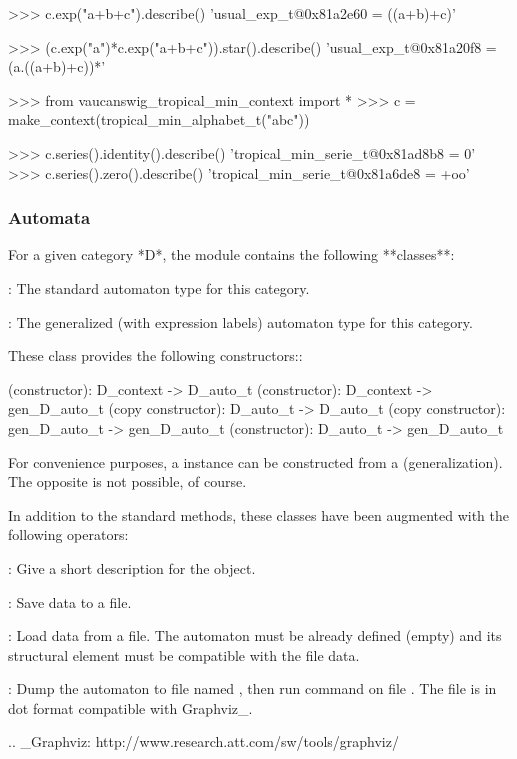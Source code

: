   >>> c.exp("a+b+c").describe()
  'usual_exp_t@0x81a2e60 = ((a+b)+c)'

  >>> (c.exp("a")*c.exp("a+b+c")).star().describe()
  'usual_exp_t@0x81a20f8 = (a.((a+b)+c))*'

  >>> from vaucanswig_tropical_min_context import *
  >>> c = make_context(tropical_min_alphabet_t("abc"))

  >>> c.series().identity().describe()
  'tropical_min_serie_t@0x81ad8b8 = 0'
  >>> c.series().zero().describe()
  'tropical_min_serie_t@0x81a6de8 = +oo'

\subsubsection{Automata}

For  a  given  category  *D*,  the  module  
contains the following **classes**:

: 
  The standard automaton type for this category.

:
  The  generalized (with  expression labels)  automaton type  for this
  category.

These class provides the following constructors::

  (constructor): D_context -> D_auto_t
  (constructor): D_context -> gen_D_auto_t
  (copy constructor): D_auto_t -> D_auto_t
  (copy constructor): gen_D_auto_t -> gen_D_auto_t
  (constructor): D_auto_t -> gen_D_auto_t

For   convenience  purposes,  a     instance   can  be
constructed from a   (generalization). The opposite is not
possible, of course.

In addition to the standard \Vauc methods, these classes have been
augmented with the following operators:

:
   Give a short description for the object.

:
   Save data to a file.

:
   Load data from a file. The automaton must be already defined (empty)
   and its structural element must be compatible with the file data.

:
   Dump the automaton to file named , then run command 
   on file . The file is in dot format compatible with Graphviz_.

.. _Graphviz: http://www.research.att.com/sw/tools/graphviz/

